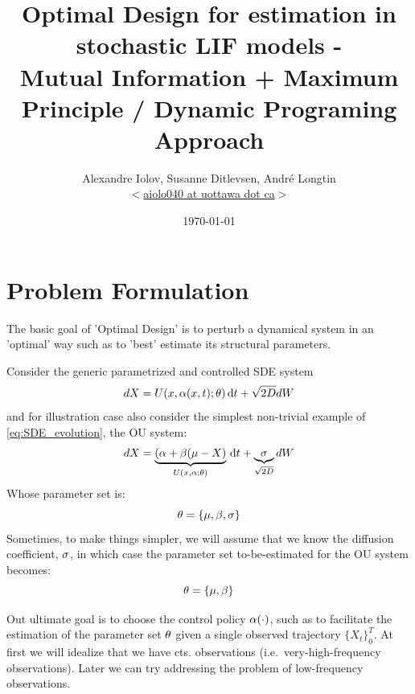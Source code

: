 \documentclass{article}
\begin{document}
\title{Optimal Design for estimation in stochastic LIF models - \\ Mutual
Information + Maximum Principle / Dynamic Programing Approach} 
\author{Alexandre
Iolov, Susanne Ditlevsen, Andr\'e Longtin \\ $<$\href{mailto:aiolo040@uottawa.ca}
		{aiolo040 at uottawa dot ca}$>$}

\date{\today}

\maketitle


\tableofcontents 

\section{Problem Formulation}
The basic goal of 'Optimal Design' is to perturb a dynamical system in an
'optimal' way such as to 'best' estimate its structural parameters.

Consider the generic parametrized and controlled SDE system 
\begin{equation}
dX = U(x,{\alpha}(x,t); {\theta}) \, \mathrm{d} t + \sqrt{2D} dW
\label{eq:SDE_evolution} 
\end{equation}
and for illustration case also consider the simplest non-trivial example of
\cref{eq:SDE_evolution}, the OU system:
\begin{equation}
dX = \underbrace{({\alpha} + {\beta}( \mu - X)}_{U(x,{\alpha}; {\theta})} \, \mathrm{d} t +
\underbrace{{\sigma }}_{\sqrt{2D}} dW
\label{eq:OU_evolution} 
\end{equation}
Whose parameter set is:
$$
{\theta} = \{{\mu }, {\beta}, {\sigma }\}
$$
Sometimes, to make things simpler, we will assume that we know the diffusion
coefficient, ${\sigma }$, in which case the parameter set to-be-estimated for the OU
system becomes: 
$$
{\theta} = \{{\mu }, {\beta}\}
$$ 

Out ultimate goal is to choose the control policy ${\alpha}(\cdot)$, such as to
facilitate the estimation of the parameter set ${\theta}$ given a single observed
trajectory $\{X_t\}_0^T$. At first we will idealize that we have cts.
observations (i.e.\ very-high-frequency observations). Later we can try
addressing the problem of low-frequency observations. 
\end{document}
